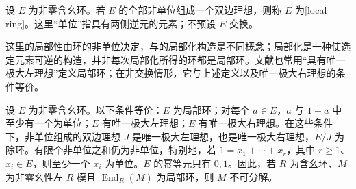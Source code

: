 \begin{definition}\label{b2:def:local-ring}
	设 \(E\) 为非零含幺环。若 \(E\) 的全部非单位组成一个双边理想，则称 \(E\) 为[local ring]。这里“单位”指具有两侧逆元的元素；不预设 \(E\) 交换。
\end{definition}

这里的局部性由环的非单位决定，与的局部化构造是不同概念；局部化是一种使选定元素可逆的构造，并非每次局部化所得的环都是局部环。文献也常用“具有唯一极大左理想”定义局部环；在非交换情形，它与上述定义以及唯一极大右理想的条件等价。

\begin{proposition}\label{b2:prop:local-ring-criterion}
	设 \(E\) 为非零含幺环。以下条件等价：\(E\) 为局部环；对每个 \(a\in E\)，\(a\) 与 \(1-a\) 中至少有一个为单位；\(E\) 有唯一极大左理想；\(E\) 有唯一极大右理想。在这些条件下，非单位组成的双边理想 \(J\) 是唯一极大左理想，也是唯一极大右理想，\(E/J\) 为除环。有限个非单位之和仍为非单位，特别地，若 \(1=x_1+\cdots+x_r\)，其中 \(r\ge1\)、\(x_i\in E\)，则至少一个 \(x_i\) 为单位。\(E\) 的幂等元只有 \(0,1\)。因此，若 \(R\) 为含幺环、\(M\) 为非零幺性左 \(R\) 模且 \(\operatorname{End}_R(M)\) 为局部环，则 \(M\) 不可分解。
\end{proposition}

